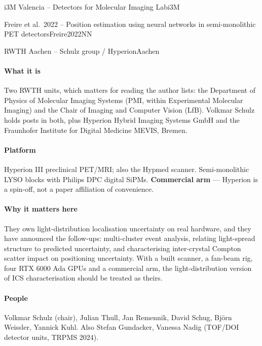\begin{programnote}{i3M Valencia -- Detectors for Molecular Imaging Lab}{i3M}
\begin{papernote}{Freire et al.\ 2022 -- Position estimation using neural networks in semi-monolithic PET detectors}{Freire2022NN}
\end{papernote}
 
\end{programnote}
 
 
 
\begin{programnote}{RWTH Aachen -- Schulz group / Hyperion}{Aachen}
 
\paragraph{What it is}
Two RWTH units, which matters for reading the author lists: the Department of
Physics of Molecular Imaging Systems (PMI, within Experimental Molecular
Imaging) and the Chair of Imaging and Computer Vision (LfB). Volkmar Schulz
holds posts in both, plus Hyperion Hybrid Imaging Systems GmbH and the
Fraunhofer Institute for Digital Medicine MEVIS, Bremen.
 
 
\paragraph{Platform}
Hyperion III preclinical PET/MRI; also the Hypmed scanner. Semi-monolithic LYSO
blocks with Philips DPC digital SiPMs. \textbf{Commercial arm} --- Hyperion is a
spin-off, not a paper affiliation of convenience.
 
\paragraph{Why it matters here}
They own light-distribution localisation uncertainty on real hardware, and they
have announced the follow-ups: multi-cluster event analysis, relating
light-spread structure to predicted uncertainty, and characterising inter-crystal
Compton scatter impact on positioning uncertainty. With a built scanner, a
fan-beam rig, four RTX 6000 Ada GPUs and a commercial arm, the
light-distribution version of ICS characterisation should be treated as theirs.
 
\paragraph{People}
Volkmar Schulz (chair), Julian Thull, Jan Remennik, David Schug, Björn Weissler,
Yannick Kuhl. Also Stefan Gundacker, Vanessa Nadig (TOF/DOI detector units,
TRPMS 2024).
 

\end{programnote}

